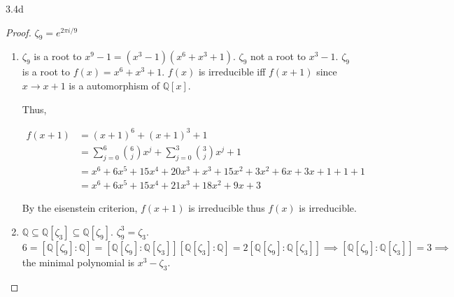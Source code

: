 \documentclass{article}
\newcommand{\Q}{\mathbb{Q}}
\begin{document}
\begin{PROB}{3.4d}\label{Problem 3.4d.}
\end{PROB}
\begin{proof}
    $\zeta_9 = e^{2\pi i / 9}$
    \begin{enumerate}
        \item $\zeta_9$ is a root to $x^9 - 1 = (x^3 - 1)(x^6 + x^3 + 1)$. $\zeta_9$ not a root to $x^3 - 1$. $\zeta_9$ is a root to $f(x) = x^6 + x^3 + 1$. $f(x)$ is irreducible iff $f(x + 1)$ since $x \to x + 1$ is a automorphism of $\Q[x]$. 
        
        Thus,

        \begin{align*}
            f(x + 1) &= (x + 1)^6 + (x + 1)^3 + 1 \\
            &= \sum_{j = 0}^{6} {6 \choose j} x^{j} + \sum_{j = 0}^{3} {3 \choose j} x^{j} + 1 \\
            &= x^6 + 6x^5 + 15x^4 + 20x^3 + x^3 + 15x^2 + 3x^2 + 6x + 3x + 1 + 1 + 1 \\
            &= x^6 + 6x^5 + 15x^4 + 21x^3 + 18x^2 + 9x+ 3
        \end{align*}

        By the eisenstein criterion, $f(x + 1)$ is irreducible thus $f(x)$ is irreducible. 
        
        \item $\Q \subseteq \Q[\zeta_3] \subseteq \Q[\zeta_9]$. 
        $\zeta_9^3 = \zeta_3$. 
        $6 = [\Q[\zeta_9] : \Q] = [\Q[\zeta_9] : \Q[\zeta_3]][\Q[\zeta_3] : \Q] = 2 [\Q[\zeta_9] : \Q[\zeta_3]] \implies [\Q[\zeta_9] : \Q[\zeta_3]] = 3 \implies$ the minimal polynomial is $x^3 - \zeta_3$.   
    \end{enumerate}
\end{proof}
\end{document}
